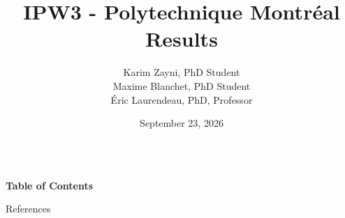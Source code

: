\documentclass[10pt,aspectratio=169,xcolor={table,xcdraw}]{beamer}
\begin{document}
\title [CHAMPS]{\large IPW3 - Polytechnique Montréal Results} 

\author[K. Zayni]{\small Karim Zayni, PhD Student \\ Maxime Blanchet, PhD Student \\ Éric Laurendeau, PhD, Professor}


\date{\small September 23, 2026}

\begin{frame}[plain]
\vspace{-0.5cm}
\begin{columns}
\titlepage
{}
\end{columns}
\end{frame}

\begin{frame}{\small \textbf{Table of Contents}}
\small
\tableofcontents
\end{frame}







\begin{frame}[allowframebreaks]{\small References}
\scriptsize

\end{frame}


\end{document}
